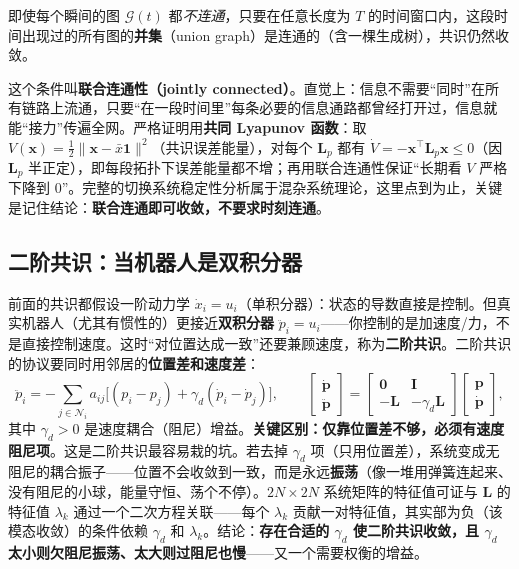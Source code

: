 \begin{theorem}[联合连通性]\label{thm:cs-jointly-conn}
即使每个瞬间的图 $\mathcal{G}(t)$ 都\emph{不连通}，只要在任意长度为 $T$ 的时间窗口内，这段时间出现过的所有图的\textbf{并集}（union graph）是连通的（含一棵生成树），共识仍然收敛。
\end{theorem}

这个条件叫\textbf{联合连通性（jointly connected）}。直觉上：信息不需要“同时”在所有链路上流通，只要“在一段时间里”每条必要的信息通路都曾经打开过，信息就能“接力”传遍全网。严格证明用\textbf{共同 Lyapunov 函数}：取 $V(\mathbf{x})=\tfrac12\|\mathbf{x}-\bar x\mathbf{1}\|^2$（共识误差能量），对每个 $\mathbf{L}_p$ 都有 $\dot V=-\mathbf{x}^\top\mathbf{L}_p\mathbf{x}\le0$（因 $\mathbf{L}_p$ 半正定），即每段拓扑下误差能量都不增；再用联合连通性保证“长期看 $V$ 严格下降到 0”。完整的切换系统稳定性分析属于混杂系统理论，这里点到为止，关键是记住结论：\textbf{联合连通即可收敛，不要求时刻连通}。

\subsection{二阶共识：当机器人是双积分器}
\label{sec:cs-second-order}

前面的共识都假设一阶动力学 $\dot x_i=u_i$（单积分器）：状态的导数直接是控制。但真实机器人（尤其有惯性的）更接近\textbf{双积分器} $\ddot p_i=u_i$——你控制的是加速度/力，不是直接控制速度。这时“对位置达成一致”还要兼顾速度，称为\textbf{二阶共识}。二阶共识的协议要同时用邻居的\textbf{位置差和速度差}：
\begin{equation}
  \ddot p_i=-\sum_{j\in\mathcal{N}_i}a_{ij}\big[(p_i-p_j)+\gamma_d(\dot p_i-\dot p_j)\big],\qquad
  \begin{bmatrix}\dot{\mathbf{p}}\\\ddot{\mathbf{p}}\end{bmatrix}=\begin{bmatrix}\mathbf{0}&\mathbf{I}\\-\mathbf{L}&-\gamma_d\mathbf{L}\end{bmatrix}\begin{bmatrix}\mathbf{p}\\\dot{\mathbf{p}}\end{bmatrix},
  \label{eq:cs-second-order}
\end{equation}
其中 $\gamma_d>0$ 是速度耦合（阻尼）增益。\textbf{关键区别：仅靠位置差不够，必须有速度阻尼项}。这是二阶共识最容易栽的坑。若去掉 $\gamma_d$ 项（只用位置差），系统变成无阻尼的耦合振子——位置不会收敛到一致，而是永远\textbf{振荡}（像一堆用弹簧连起来、没有阻尼的小球，能量守恒、荡个不停）。$2N\times2N$ 系统矩阵的特征值可证与 $\mathbf{L}$ 的特征值 $\lambda_k$ 通过一个二次方程关联——每个 $\lambda_k$ 贡献一对特征值，其实部为负（该模态收敛）的条件依赖 $\gamma_d$ 和 $\lambda_k$。结论：\textbf{存在合适的 $\gamma_d$ 使二阶共识收敛，且 $\gamma_d$ 太小则欠阻尼振荡、太大则过阻尼也慢}——又一个需要权衡的增益。

